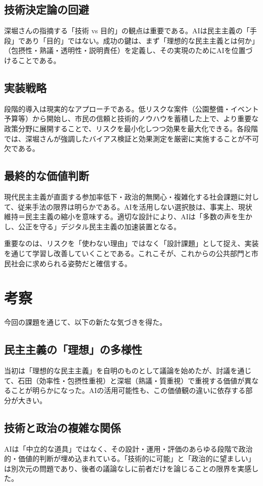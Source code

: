 \documentclass[12pt,a4j]{jarticle}
\begin{document}
\subsection{技術決定論の回避}
深堀さんの指摘する「技術 vs 目的」の観点は重要である。AIは民主主義の「手段」であり「目的」ではない。成功の鍵は、まず「理想的な民主主義とは何か」（包摂性・熟議・透明性・説明責任）を定義し、その実現のためにAIを位置づけることである。

\subsection{実装戦略}
段階的導入は現実的なアプローチである。低リスクな案件（公園整備・イベント予算等）から開始し、市民の信頼と技術的ノウハウを蓄積した上で、より重要な政策分野に展開することで、リスクを最小化しつつ効果を最大化できる。各段階では、深堀さんが強調したバイアス検証と効果測定を厳密に実施することが不可欠である。

\subsection{最終的な価値判断}
現代民主主義が直面する参加率低下・政治的無関心・複雑化する社会課題に対して、従来手法の限界は明らかである。AIを活用しない選択肢は、事実上、現状維持＝民主主義の縮小を意味する。適切な設計により、AIは「多数の声を生かし、公正を守る」デジタル民主主義の加速装置となる\cite{oecd2025}。

重要なのは、リスクを「使わない理由」ではなく「設計課題」として捉え、実装を通じて学習し改善していくことである。これこそが、これからの公共部門と市民社会に求められる姿勢だと確信する。

\section{考察}

今回の課題を通じて、以下の新たな気づきを得た。

\subsection{民主主義の「理想」の多様性}
当初は「理想的な民主主義」を自明のものとして議論を始めたが、討議を通じて、石田（効率性・包摂性重視）と深堀（熟議・質重視）で重視する価値が異なることが明らかになった。AIの活用可能性も、この価値観の違いに依存する部分が大きい。

\subsection{技術と政治の複雑な関係}
AIは「中立的な道具」ではなく、その設計・運用・評価のあらゆる段階で政治的・価値的判断が埋め込まれている。「技術的に可能」と「政治的に望ましい」は別次元の問題であり、後者の議論なしに前者だけを論じることの限界を実感した。
\end{document}
